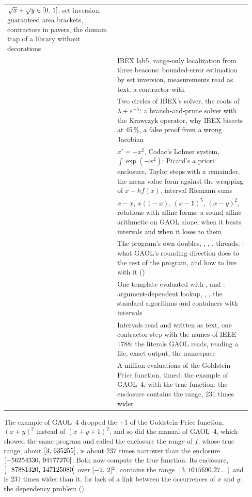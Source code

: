 \begin{longtable}{L{4.3cm}L{9.5cm}}
    $\sqrt x+\sqrt y\in[0,\,1]$: set inversion, guaranteed area brackets,
    contractors in pavers, the domain trap of a library without
    decorations\\
   & IBEX lab5, range-only localization from
    three beacons: bounded-error estimation by set inversion, measurements
    read as text, a contractor with \\
   & Two circles of IBEX's solver, the roots of
    $\lambda+e^{-\lambda}$: a branch-and-prune solver with the Krawczyk
    operator, why IBEX bisects at 45\,\%, a false proof from a wrong
    Jacobian\\
   & $x'=-x^2$, Codac's Lohner system,
    $\int\exp(-x^2)$: Picard's a priori enclosure, Taylor steps with a
    remainder, the mean-value form against the wrapping of $x+hf(x)$,
    interval Riemann sums\\
   & $x-x$, $x(1-x)$, $(x-1)^5$, $(x-y)^2$,
    rotations with affine forms: a sound affine arithmetic on GAOL alone,
    when it beats intervals and when it loses to them\\
   & The program's own doubles,
    , , , threads, :
    what GAOL's rounding direction does to the rest of the program, and how
    to live with it ()\\
   & One template evaluated with
    ,  and : argument-dependent
    lookup, , , the standard algorithms
    and containers with intervals\\
   & Intervals read and written as text, one
    contractor step with the names of IEEE 1788: the literals GAOL reads,
    reading a file, exact output, the namespace \\
   & A million evaluations of the Goldstein-Price
    function, timed: the example of GAOL~4, with the true function; the
    enclosure contains the range, 231 times wider\\
\end{longtable}
\endgroup

\begin{Rem}
The example of GAOL~4 dropped the $+1$ of the Goldstein-Price function,
$(x+y)^2$ instead of $(x+y+1)^2$, and so did the manual of GAOL~4, which
showed the same program and called the enclosure the range of $f$, whose
true range, about $[3,\,635255]$, is about 237 times narrower than the
enclosure $[-56254330,\,94177270]$. Both now compute the true
function.\newinvfive{} Its enclosure, $[-87881320,\,147125080]$ over
$[-2,\,2]^2$, contains the range $[3, 1015690.27\ldots]$ and is 231 times
wider than it, for lack of a link between the occurrences of $x$ and $y$: the
dependency problem ().
\end{Rem}

